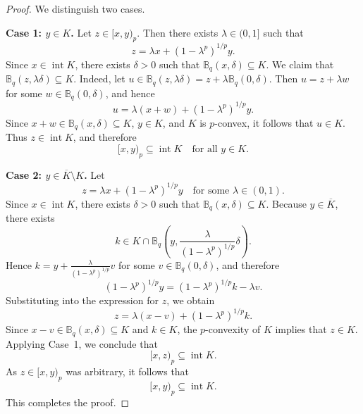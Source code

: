 \documentclass[10pt,a4paper]{amsart}
\begin{document}
\begin{proof}
We distinguish two cases.

\medskip
\noindent\textbf{Case 1: $y \in K$.}
Let $z \in [x,y)_{p}$. Then there exists $\lambda \in (0,1]$ such that
\[
z = \lambda x + (1-\lambda^{p})^{1/p} y.
\]
Since $x \in \operatorname{int} K$, there exists $\delta > 0$ such that
$\mathbb{B}_{q}(x,\delta) \subseteq K$.
We claim that $\mathbb{B}_{q}(z,\lambda\delta) \subseteq K$.
Indeed, let $u \in \mathbb{B}_{q}(z,\lambda\delta)
= z + \lambda \mathbb{B}_{q}(0,\delta)$.
Then $u = z + \lambda w$ for some $w \in \mathbb{B}_{q}(0,\delta)$, and hence
\[
u = \lambda(x+w) + (1-\lambda^{p})^{1/p} y.
\]
Since $x+w \in \mathbb{B}_{q}(x,\delta) \subseteq K$, $y \in K$, and $K$ is
$p$-convex, it follows that $u \in K$.
Thus $z \in \operatorname{int} K$, and therefore
\[
[x,y)_{p} \subseteq \operatorname{int} K \quad \text{for all } y \in K.
\]

\medskip
\noindent\textbf{Case 2: $y \in \overline{K} \setminus K$.}
Let
\[
z = \lambda x + (1-\lambda^{p})^{1/p} y
\quad \text{for some } \lambda \in (0,1).
\]
Since $x \in \operatorname{int} K$, there exists $\delta > 0$ such that
$\mathbb{B}_{q}(x,\delta) \subseteq K$.
Because $y \in \overline{K}$, there exists
\[
k \in K \cap \mathbb{B}_{q}\!\left(
y, \frac{\lambda}{(1-\lambda^{p})^{1/p}}\delta \right).
\]
Hence $k = y + \frac{\lambda}{(1-\lambda^{p})^{1/p}} v$ for some
$v \in \mathbb{B}_{q}(0,\delta)$, and therefore
\[
(1-\lambda^{p})^{1/p} y
= (1-\lambda^{p})^{1/p} k - \lambda v.
\]
Substituting into the expression for $z$, we obtain
\[
z = \lambda(x-v) + (1-\lambda^{p})^{1/p} k.
\]
Since $x-v \in \mathbb{B}_{q}(x,\delta) \subseteq K$ and $k \in K$, the
$p$-convexity of $K$ implies that $z \in K$.
Applying Case~1, we conclude that
\[
[x,z)_{p} \subseteq \operatorname{int} K.
\]
As $z \in [x,y)_{p}$ was arbitrary, it follows that
\[
[x,y)_{p} \subseteq \operatorname{int} K.
\]
This completes the proof.
\end{proof}
\end{document}
